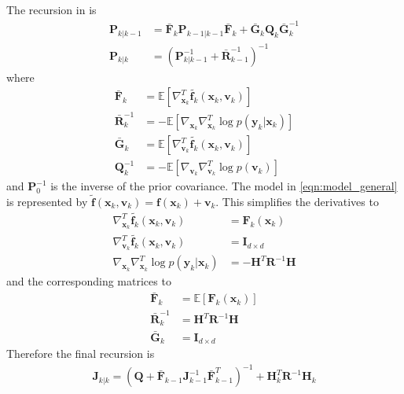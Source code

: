 \documentclass{article}
\renewcommand{\vec}[1]{\ensuremath{{\boldsymbol #1}}}
\newcommand{\mat}[1]{\ensuremath{\boldsymbol{#1}}}
\begin{document}
The recursion in \cite{Bergman2001} is
\begin{subequations}
\begin{align}
	\mat P_{k|k-1} &= \bar{\mat F}_k\mat P_{k-1|k-1}\bar{\mat F}_k + \bar{\mat G}_k\mat Q_k \bar{\mat G}_k^{-1} \\
		\mat P_{k|k} &= \left(\mat P_{k|k-1}^{-1} + \bar{\mat R}_{k-1}^{-1}\right)^{-1}
\end{align}
\end{subequations}
where
\begin{align}
	\bar{\mat F}_k &= \mathbb E \left[ \nabla_{\vec x_k}^T \tilde{\vec f_k}(\vec x_k,\vec v_k)\right] \\
	\bar{\mat R}_k^{-1} &= -\mathbb E\left[ \nabla_{\vec x_k}\nabla_{\vec x_k}^T \log p(\vec y_k|\vec x_k) \right] \\
	\bar{\mat G}_k &= \mathbb E \left[ \nabla_{\vec v_k}^T \tilde{\vec f_k}(\vec x_k,\vec v_k)\right] \\
	\mat Q_k^{-1} &= -\mathbb E \left[ \nabla_{\vec v_k}\nabla_{\vec v_k}^T \log p(\vec v_k) \right]
\end{align}
and $\mat P_0^{-1}$ is the inverse of the prior covariance. The model in \eqref{eqn:model_general} is represented by $\tilde{\vec f}(\vec x_k,\vec v_k) = \vec f(\vec x_k) + \vec v_k$. This simplifies the derivatives to
\begin{align}
	\nabla_{\vec x_k}^T \tilde{\vec f_k}(\vec x_k,\vec v_k) &= \mat F_k(\vec x_k) \\
	\nabla_{\vec v_k}^T \tilde{\vec f_k}(\vec x_k,\vec v_k) &= \mat I_{d\times d} \\
	\nabla_{\vec x_k}\nabla_{\vec x_k}^T \log p(\vec y_k|\vec x_k) &= -\mat H^T\mat R^{-1} \mat H 
\end{align}
and the corresponding matrices to	
\begin{align}
	\bar{\mat F}_k &= \mathbb E\left[ \mat F_k(\vec x_k)\right] \label{eqn:pcrb_term_F}\\
	\bar{\mat R}_k^{-1} &= \mat H^T\mat R^{-1} \mat H \\
	\bar{\mat G}_k &= \mat I_{d\times d} 
\end{align}
Therefore the final recursion is
\begin{align}
	\mat J_{k|k} = \left( \mat Q + \bar{\mat F}_{k-1} \mat J_{k-1}^{-1} \bar{\mat F}_{k-1}^T\right)^{-1} + \mat H_k^T \mat R^{-1} \mat H_k
\end{align}


\small


\end{document}
